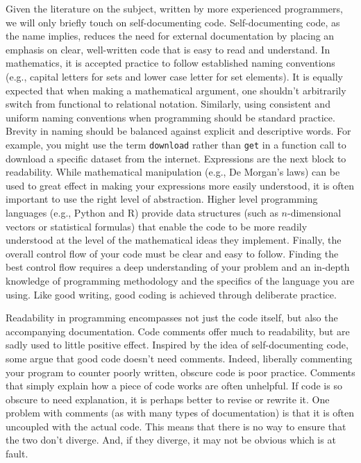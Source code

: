\documentclass[ChapterTOCs,krantz2]{krantz} %
\begin{document}
Given the literature on the subject, written by more experienced programmers,
we will only briefly touch on self-documenting code. Self-documenting code, as
the name implies, reduces the need for external documentation by placing an
emphasis on clear, well-written code that is easy to read and understand.  In
mathematics, it is accepted practice to follow established naming conventions
(e.g., capital letters for sets and lower case letter for set elements). It is
equally expected that when making a mathematical argument, one shouldn't
arbitrarily switch from functional to relational notation.  Similarly, using
consistent and uniform naming conventions when programming should be standard
practice. Brevity in naming should be balanced against explicit and descriptive
words. For example, you might use the term \texttt{download} rather than
\texttt{get} in a function call to download a specific dataset from the
internet. Expressions are the next block to readability. While mathematical
manipulation (e.g., De Morgan's laws) can be used to great effect in making
your expressions more easily understood, it is often important to use the right
level of abstraction. Higher level programming languages (e.g., Python and R)
provide data structures (such as $n$-dimensional vectors or statistical
formulas) that enable the code to be more readily understood at the level of
the mathematical ideas they implement. Finally, the overall control flow of
your code must be clear and easy to follow. Finding the best control flow
requires a deep understanding of your problem and an in-depth knowledge of
programming methodology and the specifics of the language you are using.
Like good writing, good coding is achieved through deliberate practice.

Readability in programming encompasses not just the code itself, but also the
accompanying documentation. Code comments offer much to readability, but are
sadly used to little positive effect. Inspired by the idea of self-documenting
code, some argue that good code doesn't need comments. Indeed, liberally
commenting your program to counter poorly written, obscure code is poor
practice. Comments that simply explain how a piece of code works are often
unhelpful. If code is so obscure to need explanation, it is perhaps better to
revise or rewrite it. One problem with comments (as with many types of
documentation) is that it is often uncoupled with the actual code. This means
that there is no way to ensure that the two don't diverge.  And, if they
diverge, it may not be obvious which is at fault.
\end{document}
